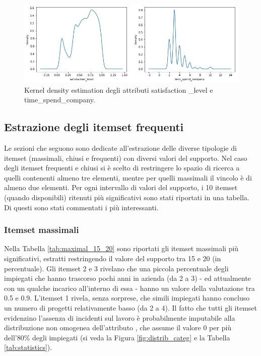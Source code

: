 \documentclass[a4paper]{article}
\begin{document}
\begin{figure}
\center
\includegraphics[width=0.9\linewidth]{numerical_feat_distributions_new.png}

\caption{Kernel density estimation degli attributi satisfaction
\_level e time\_spend\_company.}
\label{fig:kdes}
\end{figure}


\subsection{Estrazione degli itemset frequenti}

Le sezioni che seguono sono dedicate all'estrazione delle diverse tipologie di itemset (massimali, chiusi e frequenti) con diversi valori del supporto. Nel caso degli itemset frequenti e chiusi si è scelto di restringere lo spazio di ricerca a quelli contenenti almeno tre elementi, mentre per quelli massimali il vincolo è di almeno due elementi. 
Per ogni intervallo di valori del supporto, i 10 itemset (quando disponibili) ritenuti più significativi sono stati riportati in una tabella. Di questi sono stati commentati i più interessanti.

\subsubsection{Itemset massimali}
Nella Tabella \ref{tab:maximal_15_20} sono riportati gli itemset massimali più significativi, estratti restringendo il valore del supporto tra 15 e 20 (in percentuale). Gli itemset 2 e 3 rivelano che una piccola percentuale degli impiegati che hanno trascorso pochi anni in azienda (da 2 a 3) - ed attualmente con un qualche incarico all'interno di essa - hanno un valore della valutazione tra 0.5 e 0.9. L'itemset 1 rivela, senza sorprese, che simili impiegati hanno concluso un numero di progetti relativamente basso (da 2 a 4). Il fatto che tutti gli itemset evidenzino l'assenza di incidenti sul lavoro è probabilmente imputabile alla distribuzione non omogenea dell'attributo , che assume il valore 0 per più dell'80\% degli impiegati (si veda la Figura \ref{fig:distrib_categ} e la Tabella \ref{tab:statistics}).  
\end{document}
